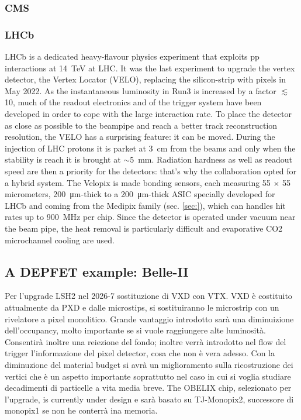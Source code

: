         \subsubsection{CMS}

        \subsubsection{LHCb}
        LHCb is a dedicated heavy-flavour physics experiment that exploits pp interactions at \SI{14}{TeV} at LHC. 
        It was the last experiment to upgrade the vertex detector, the Vertex Locator (VELO), replacing the silicon-strip with pixels in May 2022. 
        As the instantaneous luminosity in Run3 is increased by a factor $\lesssim$10, much of the readout electronics and of the trigger system have been developed in order to cope with the large interaction rate.
        To place the detector as close as possible to the beampipe and reach a better track reconstruction resolution, the VELO has a surprising feature: it can be moved. During the injection of LHC protons it is parket at \SI{3}{cm} from the beams and only when the stability is reach it is brought at $\sim$\SI{5}{mm}. Radiation hardness as well as readout speed are then a priority for the detectors: that's why the collaboration opted for a hybrid system. 
        The Velopix is made bonding sensors, each measuring 55 $\times$ 55 micrometers, \SI{200}{\um}-thick to a \SI{200}{\um}-thick ASIC specially developed for LHCb and coming from the Medipix family (sec. \ref{sec:}), which can handles hit rates up to \SI{900}{MHz} per chip.
        Since the detector is operated under vacuum near the beam pipe, the heat removal is particularly difficult and evaporative CO2 microchannel cooling are used. 

    \subsection{A DEPFET example: Belle-II}

    Per l'upgrade LSH2 nel 2026-7 sostituzione di VXD con VTX. VXD è costituito attualmente da PXD e dalle microstips, si sostituiranno le microstrip con un rivelatore a pixel monolitico. 
    Grande vantaggio introdotto sarà una diminuizione dell'occupancy, molto importante se si vuole raggiungere alte luminosità. Consentirà inoltre una  reiezione del fondo; inoltre verrà introdotto nel flow del trigger l'informazione del pixel detector, cosa che non è vera adesso. 
    Con la diminuzione del material budget si avrà un miglioramento sulla ricostruzione dei vertici che è un aspetto importante soprattutto nel caso in cui si voglia studiare decadimenti di particelle a vita media breve.
    The OBELIX chip, selezionato per l'upgrade, is currently under design e sarà basato su TJ-Monopix2, successore di monopix1 se non he conterrà ina memoria. 

